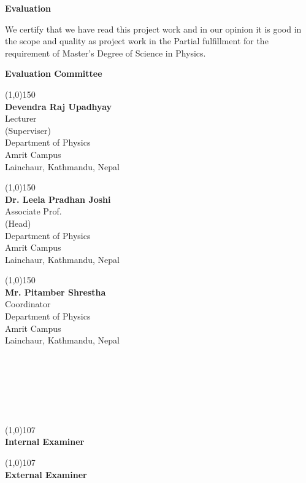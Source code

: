 \documentclass[12pt,a4paper]{report}
\begin{document}
\clearpage
{}
\begin{center}
	\Large{\bfseries Evaluation}
\end{center}
We certify that we have read this project work and in our opinion it is good in the scope and quality as project work in the Partial fulfillment for the requirement of Master's Degree of Science in Physics.
\\
\begin{center}
	\vspace{1cm}
	\bf{Evaluation Committee}
\end{center}
\bigskip
\bigskip
\bigskip
\bigskip
\bigskip
\bigskip
\begin{minipage}{2in}
	\begin{center}
		\line(1,0){150}\\
		{\bfseries Devendra Raj Upadhyay}\\
		Lecturer\\
		(Superviser)\\
		Department of Physics\\
		Amrit Campus\\
		Lainchaur, Kathmandu, Nepal
	\end{center}
\end{minipage}
\hfill
\begin{minipage}{2in}
	\begin{center}
		\line(1,0){150}\\
		{\bfseries Dr. Leela Pradhan Joshi}\\
		Associate Prof.\\
		(Head)\\
		Department of Physics\\
		Amrit Campus\\
		Lainchaur, Kathmandu, Nepal
	\end{center}
\end{minipage}
\hfill
\begin{minipage}{2in}
	\begin{center}
		\line(1,0){150}\\
		{\bfseries Mr. Pitamber Shrestha}\\
		Coordinator\\
		Department of Physics\\
		Amrit Campus\\
		Lainchaur, Kathmandu, Nepal
	\end{center}
\end{minipage}
\\\\\\\\\\
\begin{minipage}{2in}
	\line(1,0){107}\\
	{\bfseries Internal Examiner}
\end{minipage}
\hfill
\begin{minipage}{2in}
	\line(1,0){107}\\
	{\bfseries External Examiner}
\end{minipage}
\end{document}
